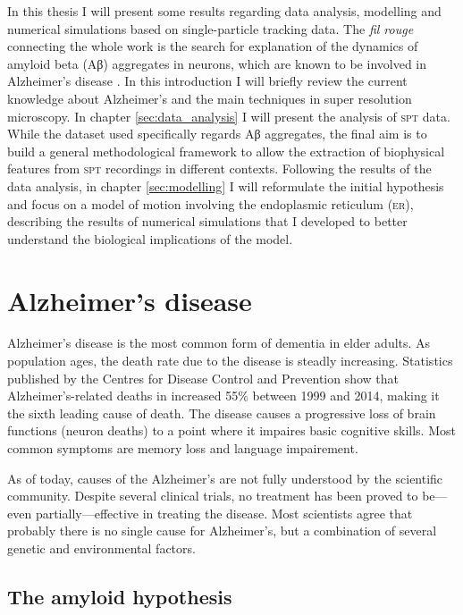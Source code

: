In this thesis I will present some results regarding data analysis, modelling and numerical simulations based on single-particle tracking data. The \textit{fil rouge} connecting the whole work is the search for explanation of the dynamics of amyloid beta (Aβ) aggregates in neurons, which are known to be involved in Alzheimer's disease . In this introduction I will briefly review the current knowledge about Alzheimer's and the main techniques in super resolution microscopy. In chapter \ref{sec:data_analysis} I will present the analysis of \textsc{spt} data. While the dataset used specifically regards Aβ aggregates, the final aim is to build a general methodological framework to allow the extraction of biophysical features from \textsc{spt} recordings in different contexts. Following the results of the data analysis, in chapter \ref{sec:modelling} I will reformulate the initial hypothesis and focus on a model of motion involving the endoplasmic reticulum (\textsc{er}), describing the results of numerical simulations that I developed to better understand the biological implications of the model.

\section{Alzheimer's disease}\label{sec:alzheimer}

Alzheimer’s disease is the most common form of dementia in elder adults. As population ages, the death rate due to the disease is steadly increasing. Statistics published by the Centres for Disease Control and Prevention show that Alzheimer’s-related deaths in  increased 55\% between 1999 and 2014, making it the sixth leading cause of death. The disease causes a progressive loss of brain functions (neuron deaths) to a point where it impaires basic cognitive skills. Most common symptoms are memory loss and language impairement.

As of today, causes of the Alzheimer’s are not fully understood by the scientific community. Despite several clinical trials, no treatment has been proved to be---even partially---effective in treating the disease. Most scientists agree that probably there is no single cause for Alzheimer’s, but a combination of several genetic and environmental factors.


\subsection{The amyloid hypothesis}

